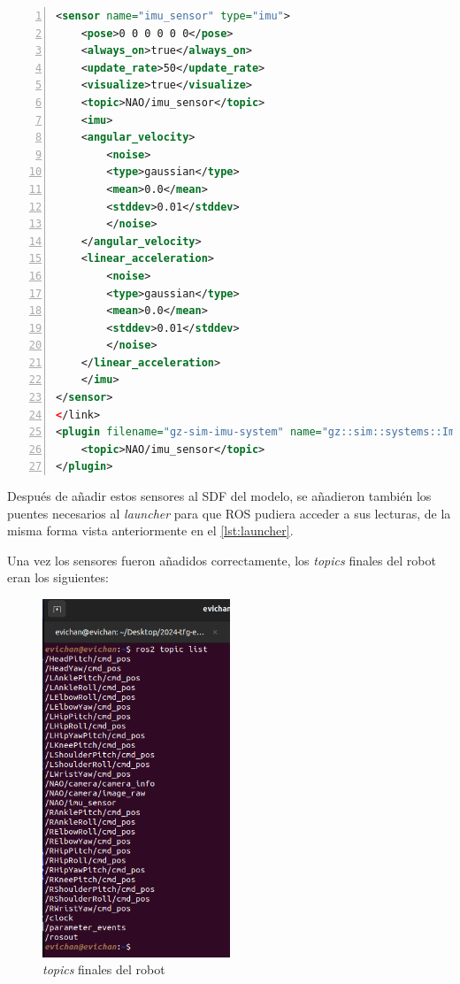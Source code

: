 \begin{lstlisting}[language=XML, caption={Adición del sensor IMU al modelo}, label={lst:imu_modelo}, numbers=left, backgroundcolor=\color{gray!10}]    
<sensor name="imu_sensor" type="imu">
    <pose>0 0 0 0 0 0</pose>
    <always_on>true</always_on>
    <update_rate>50</update_rate>
    <visualize>true</visualize>
    <topic>NAO/imu_sensor</topic>
    <imu>
    <angular_velocity>
        <noise>
        <type>gaussian</type>
        <mean>0.0</mean>
        <stddev>0.01</stddev>
        </noise>
    </angular_velocity>
    <linear_acceleration>
        <noise>
        <type>gaussian</type>
        <mean>0.0</mean>
        <stddev>0.01</stddev>
        </noise>
    </linear_acceleration>
    </imu>
</sensor>       
</link>
<plugin filename="gz-sim-imu-system" name="gz::sim::systems::Imu">
    <topic>NAO/imu_sensor</topic>
</plugin> 
\end{lstlisting}

Después de añadir estos sensores al SDF del modelo, se añadieron también los puentes necesarios al \textit{launcher} para que ROS pudiera acceder a sus lecturas, de la misma forma vista anteriormente en el \autoref{lst:launcher}.

Una vez los sensores fueron añadidos correctamente, los \textit{topics} finales del robot eran los siguientes:

\begin{figure}[H]
  \centering
  \includegraphics[width=0.5\textwidth]{figures/cap_4/topics_completos.png}
  \caption{\textit{topics} finales del robot}
  \label{fig:topics_completos}
\end{figure}

